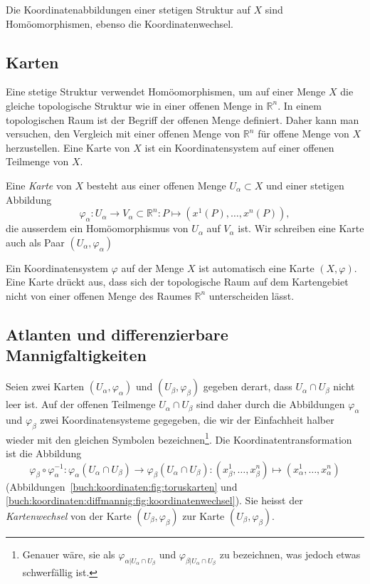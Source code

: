 Die Koordinatenabbildungen einer stetigen Struktur auf $X$ sind
Homöomorphismen, ebenso die Koordinatenwechsel.

%
%
\subsection{Karten}
Eine stetige Struktur verwendet Homöomorphismen, um auf einer Menge $X$
die gleiche topologische Struktur wie in einer offenen Menge in
$\mathbb{R}^n$.
In einem topologischen Raum ist der Begriff der offenen Menge definiert.
Daher kann man versuchen, den Vergleich mit einer offenen Menge von
$\mathbb{R}^n$ für offene Menge von $X$ herzustellen.
Eine Karte von $X$ ist ein Koordinatensystem auf einer offenen Teilmenge
von $X$.

\begin{definition}[Karte]
Eine {\em Karte} von $X$ besteht aus einer offenen Menge $U_\alpha\subset X$
und einer stetigen Abbildung
\[
\varphi_\alpha
\colon
U_\alpha\to V_\alpha\subset\mathbb{R}^n
:
P
\mapsto
(x^1(P),\dots,x^n(P)),
\]
die ausserdem ein Homöomorphismus von $U_\alpha$ auf $V_\alpha$ ist.
Wir schreiben eine Karte auch als Paar $(U_\alpha,\varphi_\alpha)$
%
\end{definition}

Ein Koordinatensystem $\varphi$ auf der Menge $X$ ist automatisch eine
Karte $(X,\varphi)$.
Eine Karte drückt aus, dass sich der topologische Raum auf dem
Kartengebiet nicht von einer offenen Menge des Raumes $\mathbb{R}^n$
unterscheiden lässt.

%
%
\subsection{Atlanten und differenzierbare Mannigfaltigkeiten}
%
%
Seien zwei Karten $(U_\alpha,\varphi_\alpha)$ und $(U_\beta,\varphi_\beta)$
gegeben derart, dass $U_\alpha\cap U_\beta$ nicht leer ist.
Auf der offenen Teilmenge $U_\alpha\cap U_\beta$ sind daher durch
die Abbildungen $\varphi_\alpha$ und $\varphi_\beta$ zwei
Koordinatensysteme gegegeben, die wir der Einfachheit halber wieder
mit den gleichen Symbolen bezeichnen\footnote{Genauer wäre, sie als
$\varphi_{\alpha|U_\alpha\cap U_\beta}$ und
$\varphi_{\beta|U_\alpha\cap U_\beta}$ zu bezeichnen, was jedoch
etwas schwerfällig ist.}.
Die Koordinatentransformation ist die Abbildung
\[
\varphi_\beta\circ\varphi_\alpha^{-1}
\colon
\varphi_\alpha(U_\alpha\cap U_\beta)
\to
\varphi_\beta(U_\alpha\cap U_\beta)
:
(x_\beta^1,\dots,x_\beta^n)
\mapsto
(x_\alpha^1,\dots,x_\alpha^n)
\]
(Abbildungen~\ref{buch:koordinaten:fig:toruskarten} und
\ref{buch:koordinaten:diffmannig:fig:koordinatenwechsel}).
Sie heisst der {\em Kartenwechsel} von der Karte $(U_\beta,\varphi_\beta)$
zur Karte $(U_\beta,\varphi_\beta)$.
%

